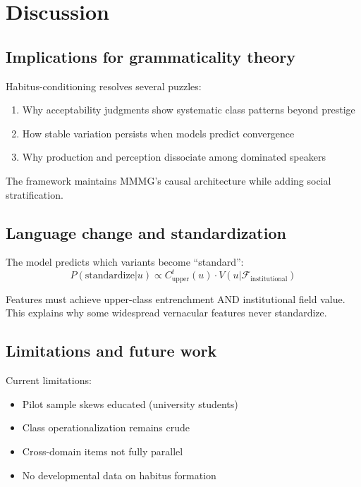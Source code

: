 \documentclass[12pt]{article}
\begin{document}
\section{Discussion}

\subsection{Implications for grammaticality theory}

Habitus-conditioning resolves several puzzles:
\begin{enumerate}
\item Why acceptability judgments show systematic class patterns beyond prestige
\item How stable variation persists when models predict convergence  
\item Why production and perception dissociate among dominated speakers
\end{enumerate}

The framework maintains MMMG's causal architecture while adding social stratification.

\subsection{Language change and standardization}

The model predicts which variants become \enquote{standard}:
\begin{equation}
P(\text{standardize} | u) \propto C^t_{\text{upper}}(u) \cdot V(u|\mathcal{F}_{\text{institutional}})
\end{equation}

Features must achieve upper-class entrenchment AND institutional field value. This explains why some widespread vernacular features never standardize.

\subsection{Limitations and future work}

Current limitations:
\begin{itemize}
\item Pilot sample skews educated (university students)
\item Class operationalization remains crude  
\item Cross-domain items not fully parallel
\item No developmental data on habitus formation
\end{itemize}
\end{document}
